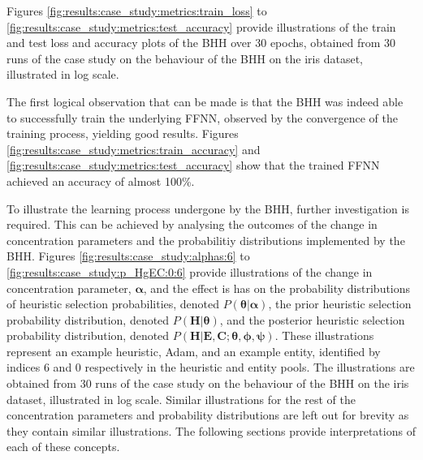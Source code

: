 Figures \ref{fig:results:case_study:metrics:train_loss} to \ref{fig:results:case_study:metrics:test_accuracy} provide illustrations of the train and test loss and accuracy plots of the \acs{BHH} over 30 epochs, obtained from 30 runs of the case study on the behaviour of the \acs{BHH} on the iris dataset, illustrated in log scale.

The first logical observation that can be made is that the \acs{BHH} was indeed able to successfully train the underlying \acs{FFNN}, observed by the convergence of the training process, yielding good results. Figures \ref{fig:results:case_study:metrics:train_accuracy} and \ref{fig:results:case_study:metrics:test_accuracy} show that the trained \acs{FFNN} achieved an accuracy of almost 100\%.

To illustrate the learning process undergone by the \acs{BHH}, further investigation is required. This can be achieved by analysing the outcomes of the change in concentration parameters and the probabilitiy distributions implemented by the \acs{BHH}. Figures \ref{fig:results:case_study:alphas:6} to \ref{fig:results:case_study:p_HgEC:0:6} provide illustrations of the change in concentration parameter, $\boldsymbol{\alpha}$, and the effect is has on the probability distributions of heuristic selection probabilities, denoted $P(\boldsymbol{\theta} \vert \boldsymbol{\alpha})$, the prior heuristic selection probability distribution, denoted $P(\boldsymbol{H} \vert \boldsymbol{\theta})$, and the posterior heuristic selection probability distribution, denoted $P(\boldsymbol{H} \vert \boldsymbol{E}, \boldsymbol{C}; \boldsymbol{\theta}, \boldsymbol{\phi}, \boldsymbol{\psi})$. These illustrations represent an example heuristic, \acs{Adam}, and an example entity, identified by indices 6 and 0 respectively in the heuristic and entity pools. The illustrations are obtained from 30 runs of the case study on the behaviour of the \acs{BHH} on the iris dataset, illustrated in log scale. Similar illustrations for the rest of the concentration parameters and probability distributions are left out for brevity as they contain similar illustrations. The following sections provide interpretations of each of these concepts.

